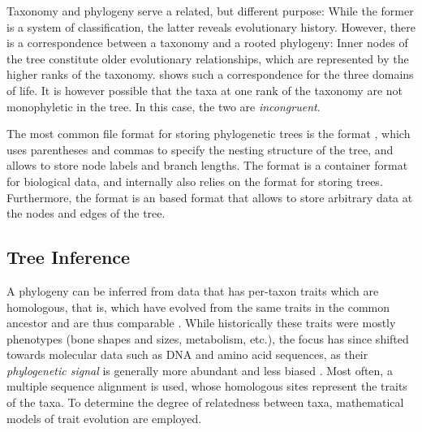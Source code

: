 Taxonomy and phylogeny serve a related, but different purpose:
While the former is a system of classification,
the latter reveals evolutionary history.
However, there is a correspondence between a taxonomy and a rooted phylogeny:
Inner nodes of the tree constitute older evolutionary relationships,
which are represented by the higher ranks of the taxonomy.
 shows such a correspondence for the three domains of life.
It is however possible that the taxa at one rank of the taxonomy are not monophyletic in the tree.
In this case, the two are \emph{incongruent}.


The most common file format for storing phylogenetic trees is the  format \cite{Archie1986},
which uses parentheses and commas to specify the nesting structure of the tree,
and allows to store node labels and branch lengths.
The  format \cite{Maddison1997} is a container format for biological data,
and internally also relies on the  format for storing trees.
Furthermore, the  format \cite{Han2009} is an  based format
that allows to store arbitrary data at the nodes and edges of the tree.


\subsection{Tree Inference}
\label{ch:Foundations:sec:TreeOfLife:sub:TreeInference}

A phylogeny can be inferred from data that has per-taxon traits which are homologous,
that is, which have evolved from the same traits in the common ancestor and are thus comparable \cite{Felsenstein2004,Yang2006}.
While historically these traits were mostly phenotypes (bone shapes and sizes, metabolism, etc.),
the focus has since shifted towards molecular data such as DNA and amino acid sequences,
as their \emph{phylogenetic signal} is generally more abundant and less biased \cite{Hillis2000}.
Most often, a multiple sequence alignment is used,
whose homologous sites represent the traits of the taxa.
To determine the degree of relatedness between taxa, mathematical models of trait evolution are employed.

